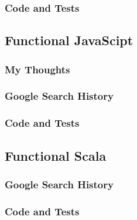 \documentclass[letterpaper, 10pt, DIV=13]{scrartcl}
\numberwithin{equation}{section}
\numberwithin{figure}{section}
\numberwithin{table}{section}
\begin{document}
\subsubsection{Code and Tests}



\subsection{Functional JavaScipt}
\subsubsection{My Thoughts}

\subsubsection{Google Search History}

\subsubsection{Code and Tests}

\subsection{Functional Scala}

\subsubsection{Google Search History}

\subsubsection{Code and Tests}
\end{document}

